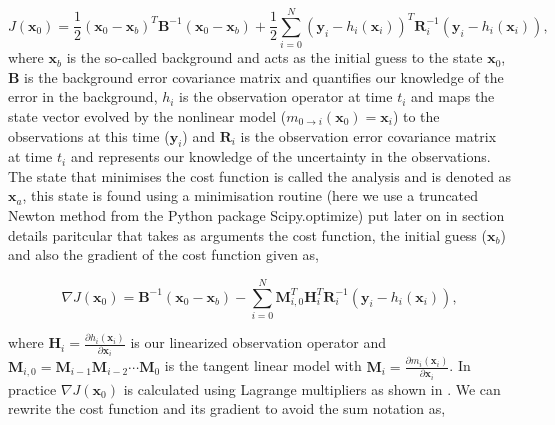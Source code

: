 \documentclass[11pt]{article}
\begin{document}
\begin{equation}
J(\textbf{x}_0) = \frac{1}{2}(\textbf{x}_0-\textbf{x}_b)^{T}\textbf{B}^{-1}(\textbf{x}_0-\textbf{x}_b)+\frac{1}{2}\sum_{i=0}^{N}(\textbf{y}_i-h_i(\textbf{x}_i))^{T}\textbf{R}_{i}^{-1}(\textbf{y}_i-h_i(\textbf{x}_i)),
\end{equation}
where $\textbf{x}_b$ is the so-called background and acts as the initial guess to the state $\textbf{x}_0$, $\textbf{B}$ is the background error covariance matrix and quantifies our knowledge of the error in the background, $h_i$ is the observation operator at time $t_i$ and maps the state vector evolved by the nonlinear model ($m_{0\rightarrow i}(\mathbf{x}_{0})=\textbf{x}_i$) to the observations at this time ($\textbf{y}_i$) and $\textbf{R}_i$ is the observation error covariance matrix at time $t_i$ and represents our knowledge of the uncertainty in the observations. The state that minimises the cost function is called the analysis and is denoted as $\textbf{x}_a$, this state is found using a minimisation routine {\color{red}(here we use a truncated Newton method \citep{Nocedal1999} from the Python package Scipy.optimize) put later on in section details paritcular} that takes as arguments the cost function, the initial guess ($\textbf{x}_b$) and also the gradient of the cost function given as,

\begin{equation}
\nabla J(\textbf{x}_0) = \textbf{B}^{-1}(\textbf{x}_0-\textbf{x}_b)-\sum_{i=0}^{N}\textbf{M}_{i,0}^{T}\textbf{H}_i^{T}\textbf{R}_{i}^{-1}(\textbf{y}_i-h_i(\textbf{x}_i)),
\end{equation}

where $\textbf{H}_i = \frac{\partial h_i(\textbf{x}_i)}{\partial\textbf{x}_i}$ is our linearized observation operator and $\mathbf{M}_{i,0}=\mathbf{M}_{i-1}\mathbf{M}_{i-2}\cdots\mathbf{M}_0$ is the tangent linear model with $\mathbf{M}_i=\frac{\partial m_{i}(\textbf{x}_{i})}{\partial \textbf{x}_{i}}$. In practice $\nabla J(\textbf{x}_0)$ is calculated using Lagrange multipliers as shown in \citet{lawless2013}. We can rewrite the cost function and its gradient to avoid the sum notation as,
\end{document}
